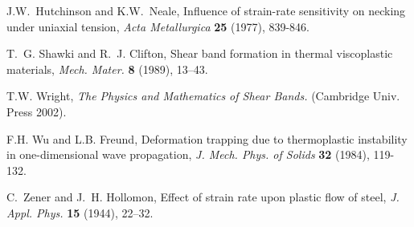 \documentclass[a4paper,11pt]{article}
\begin{document}
\begin{thebibliography}{10}
{\sc J.W.~Hutchinson and K.W.~Neale},
Influence of strain-rate sensitivity on necking under uniaxial tension,
{\it  Acta Metallurgica} {\bf 25} (1977), 839-846.
% 
% 
% 
% 
% 
% 
% 
% 

% 
% 

% 
% 
% 
{\sc T.~G. Shawki and R.~J. Clifton}, 
Shear band formation in thermal viscoplastic materials, 
{\it Mech. Mater.}
{\bf 8 } (1989), 13--43.
% 
% 
% 
% 

% 
% 
{\sc T.W. Wright}, 
{\it The Physics and Mathematics of Shear Bands.} (Cambridge Univ. Press 2002).
% 

{\sc F.H. Wu and L.B. Freund},
Deformation trapping due to thermoplastic instability in one-dimensional wave propagation,
{\it J. Mech. Phys. of Solids} {\bf  32} (1984), 119-132.

{\sc C.~Zener and J.~H. Hollomon}, 
Effect of strain rate upon plastic flow of steel,
{\it J. Appl. Phys.}
{\bf 15} (1944), 22--32.

\end{thebibliography}
\end{document}
